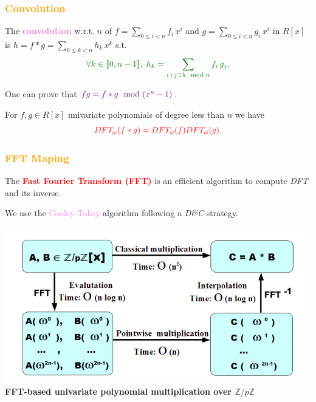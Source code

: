 \begin{frame}[fragile]
\frametitle{\textbf{\textcolor{orange}{Convolution}}}

\begin{Definition}
The \textcolor{violet}{\textbf{convolution}} w.r.t. $n$ of $f = \sum_{0\leq i < n} f_i\,x^i$ and $g = \sum_{0\leq i < n} g_i\,x^i$ in $R[x]$ is $h = f*g = \sum_{0\leq k < n}h_k\, x^k$ s.t.
$$\textcolor{darkgreen}{\forall k \in \mbox{\textlbrackdbl} 0, n-1\mbox{\textrbrackdbl},\; h_k = \sum_{i+j\equiv k \mod n}f_i\,g_j}.$$
\end{Definition}

\begin{block}{}
One can prove that $\textcolor{violet}{fg = f*g \mod (x^n-1)}$.
\end{block}

\begin{Lemma}
For $f,g \in R[x]$ univariate polynomials of degree less than $n$ we have 
$$\textcolor{red}{DFT_{\omega}(f * g) = DFT_{\omega}(f)DFT_{\omega}(g)}.$$
\end{Lemma}


\end{frame}

\begin{frame}[fragile]
\frametitle{\textbf{\textcolor{orange}{FFT Maping}}}

\begin{Definition}
The \textcolor{red}{\textbf{Fast Fourier Transform (FFT)}} is an efficient algorithm to compute \textit{DFT} and its inverse. 
\end{Definition}

We use the \textcolor{violet}{Cooley-Tukey} algorithm following a \textit{D{\&}C} strategy.
\begin{center}
\includegraphics[scale = 0.2]{FFT.png}\\
\small\textbf{FFT-based univariate polynomial multiplication over $\mathbb{Z}/p\mathbb{Z}$}\\
\end{center}

\end{frame}
